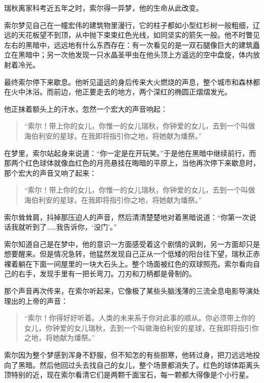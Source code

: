 \documentclass[AutoFakeBold=true]{book}
\begin{document}
瑞秋离家科考近五年之时，索尔得一异梦，他的生命从此改变。

\vspace*{1em}

索尔梦见自己在一幢宏伟的建筑物里漫行，它的柱子都如小型红杉树一般粗细，辽远的天花板望不到顶，从中抛下束束红色光线，如同坚实的箭矢一般。他不时瞥见左右的黑暗中，远远地有什么东西存在：有一次看见的是一双石腿像巨大的建筑矗立在黑暗中；另一次他发现一只水晶圣甲虫在他头顶上方遥远的空中盘旋，体内放射着冷光。

最终索尔停下来歇息。他听见遥远的身后传来大火燃烧的声息，整个城市和森林都在火中沐浴。而前边，他正要走去的地方，两个深红的椭圆正熠熠发光。

他正抹着额头上的汗水，忽然一个宏大的声音响起：

\begin{quotation}
	{\kaishu ``索尔！带上你的女儿，你惟一的女儿瑞秋，你钟爱的女儿，去到一个叫做海伯利安的星球，在我即将指引你之地，将她献为燔祭。''}
\end{quotation}

在梦里，索尔站起身来说道：``你一定是在开玩笑。''于是他在黑暗中继续前行，而那两个红色球体就像血红色的月亮悬挂在晦暗的平原上，当他再次停下来歇息时，那个宏大的声音又响了起来：

\begin{quotation}
	{\kaishu ``索尔！带上你的女儿，你惟一的女儿瑞秋，你钟爱的女儿，去到一个叫做海伯利安的星球，在我即将指引你之地，将她献为燔祭。''}
\end{quotation}

索尔耸耸肩，抖掉那压迫人的声音，然后清清楚楚地对着黑暗说道：``你第一次说话我就听到了……我告诉你，`没门'。''

索尔知道自己是在梦中，他的意识一方面感受着这个剧情的讽刺，另一方面却只是想要醒来。但是情况急转，他猛然发现自己正从一个低矮的阳台往下望，瑞秋正赤裸着躺在下面一间屋里的一块大石头上。整个场面被红色的双球照亮。索尔看向自己的右手，发现手里有一把长弯刀。刀刃和刀柄都是骨制的。

那个声音再次传来，在索尔听起来，它像极了某些头脑浅薄的三流全息电影导演处理出的上帝的声音：

\begin{quotation}
	{\kaishu ``索尔！你得好好听着。人类的未来系于你对此事的顺从。你必须带上你的女儿，你钟爱的女儿瑞秋，去到一个叫做海伯利安的星球，在我即将指引你之地，将她献为燔祭。''}
\end{quotation}

索尔因为整个梦感到浑身不舒服，但不知怎的有些胆寒，他转过身，把刀远远地投向了黑暗。然后他回过头去找自己的女儿，整个场景都消失了。红色的球体距离头顶特别的近，现在索尔看清它们是两颗千面宝石，每一颗都大得像是个小行星。
\end{document}
